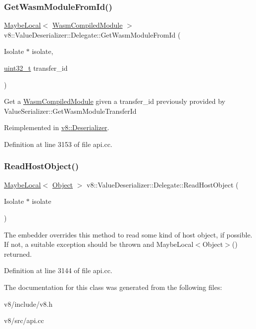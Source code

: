 \subsubsection{\texorpdfstring{Get\+Wasm\+Module\+From\+Id()}{GetWasmModuleFromId()}}
{\footnotesize\ttfamily \mbox{\hyperlink{classv8_1_1MaybeLocal}{Maybe\+Local}}$<$ \mbox{\hyperlink{classv8_1_1WasmCompiledModule}{Wasm\+Compiled\+Module}} $>$ v8\+::\+Value\+Deserializer\+::\+Delegate\+::\+Get\+Wasm\+Module\+From\+Id (\begin{DoxyParamCaption}\item[{Isolate $\ast$}]{isolate,  }\item[{\mbox{\hyperlink{classuint32__t}{uint32\+\_\+t}}}]{transfer\+\_\+id }\end{DoxyParamCaption})\hspace{0.3cm}{\ttfamily [virtual]}}

Get a \mbox{\hyperlink{classv8_1_1WasmCompiledModule}{Wasm\+Compiled\+Module}} given a transfer\+\_\+id previously provided by Value\+Serializer\+::\+Get\+Wasm\+Module\+Transfer\+Id 

Reimplemented in \mbox{\hyperlink{classv8_1_1Deserializer_ad120ac7532b6965d9cefdef29f971661}{v8\+::\+Deserializer}}.



Definition at line 3153 of file api.\+cc.

\mbox{\label{classv8_1_1ValueDeserializer_1_1Delegate_a705e325895f76f6cac213b89b505f960}} 
\subsubsection{\texorpdfstring{Read\+Host\+Object()}{ReadHostObject()}}
{\footnotesize\ttfamily \mbox{\hyperlink{classv8_1_1MaybeLocal}{Maybe\+Local}}$<$ \mbox{\hyperlink{classv8_1_1Object}{Object}} $>$ v8\+::\+Value\+Deserializer\+::\+Delegate\+::\+Read\+Host\+Object (\begin{DoxyParamCaption}\item[{Isolate $\ast$}]{isolate }\end{DoxyParamCaption})\hspace{0.3cm}{\ttfamily [virtual]}}

The embedder overrides this method to read some kind of host object, if possible. If not, a suitable exception should be thrown and Maybe\+Local$<$\+Object$>$() returned. 

Definition at line 3144 of file api.\+cc.



The documentation for this class was generated from the following files\+:\begin{DoxyCompactItemize}
\item 
v8/include/v8.\+h\item 
v8/src/api.\+cc\end{DoxyCompactItemize}
